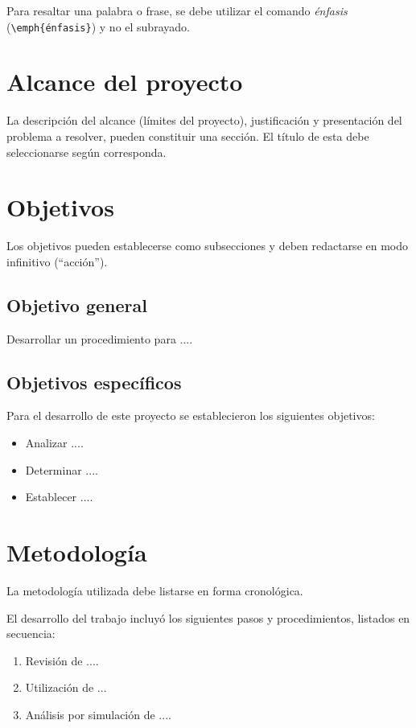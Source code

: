 Para resaltar una palabra o frase, se debe utilizar el comando \emph{énfasis} (\texttt{\textbackslash emph\{énfasis\}}) y no el subrayado.

\section{Alcance del proyecto}
La descripción del alcance (límites del proyecto), justificación y presentación del problema a resolver, pueden constituir una sección.  El título de esta debe seleccionarse según corresponda.

\section{Objetivos}
Los objetivos pueden establecerse como subsecciones y deben redactarse en modo infinitivo (``acción'').

\subsection{Objetivo general}
Desarrollar un procedimiento para .... 

\subsection{Objetivos específicos}
Para el desarrollo de este proyecto se establecieron los siguientes objetivos:

\begin{itemize} %
	\item Analizar ....
	\item Determinar ....
	\item Establecer ....
\end{itemize}

\section{Metodología}
La metodología utilizada debe listarse en forma cronológica.

El desarrollo del trabajo incluyó los siguientes pasos y procedimientos, listados en secuencia:

\begin{enumerate}  %
	\item Revisión de ....
	\item Utilización de ...
	\item Análisis por simulación de ....
\end{enumerate}

